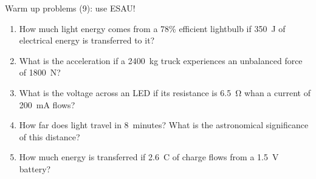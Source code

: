 \documentclass[14pt]{beamer}
\begin{document}
\begin{frame}{Warm up problems (9): use ESAU!}
\vspace*{-0.8em}\begin{enumerate}
\item\label{17.2} How much light energy comes from a 78\% efficient lightbulb if \SI{350}{J} of electrical energy is transferred to it?
\item\label{2.3} What is the acceleration if a \SI{2400}{kg} truck experiences an unbalanced force of \SI{1800}{N}?
\item\label{11.1} What is the voltage across an LED if its resistance is \SI{6.5}{\ohm} whan a current of \SI{200}{mA} flows?
\item\label{1.2} How far does light travel in \SI{8}{minutes}?  What is the astronomical significance of this distance?
\item\label{13.1} How much energy is transferred if \SI{2.6}{C} of charge flows from a \SI{1.5}{V} battery?
\end{enumerate}
\end{frame}
\end{document}
